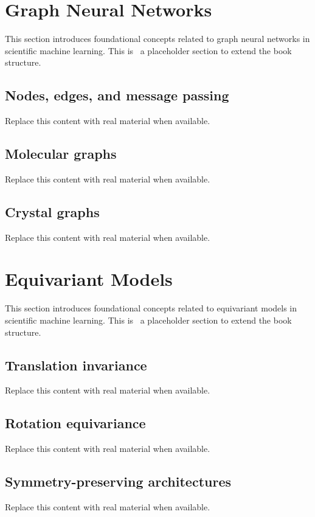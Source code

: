 
\section{Graph Neural Networks}
This section introduces foundational concepts related to graph neural networks in scientific machine learning. This is~\cite{abdulmaksoudTransformerBasedSensorFusion2025} a placeholder section to extend the book structure.

\subsection{Nodes, edges, and message passing}
Replace this content with real material when available.

\subsection{Molecular graphs}
Replace this content with real material when available.

\subsection{Crystal graphs}
Replace this content with real material when available.

\section{Equivariant Models}
This section introduces foundational concepts related to equivariant models in scientific machine learning. This is~\cite{abdulmaksoudTransformerBasedSensorFusion2025} a placeholder section to extend the book structure.

\subsection{Translation invariance}
Replace this content with real material when available.

\subsection{Rotation equivariance}
Replace this content with real material when available.

\subsection{Symmetry-preserving architectures}
Replace this content with real material when available.

